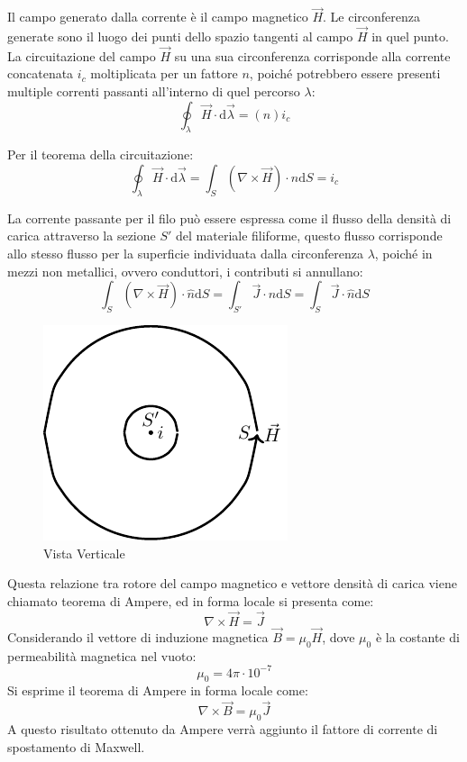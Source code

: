 \documentclass{article}
\newcommand{\df}{\mathrm{d}}
\numberwithin{equation}{subsection}
\begin{document}
Il campo generato dalla corrente è il campo magnetico $\vec{H}$. Le circonferenza generate sono il luogo dei punti dello spazio tangenti al campo $\vec{H}$ 
in quel punto. La circuitazione del campo $\vec{H}$ su una sua circonferenza corrisponde alla corrente concatenata $i_c$ moltiplicata per un fattore $n$, poiché potrebbero essere presenti multiple 
correnti passanti all'interno di quel percorso $\lambda$: 
\begin{equation*}
    \displaystyle\oint_{\lambda}\vec{H}\cdot \df\vec{\lambda}=(n)i_c
\end{equation*}

Per il teorema della circuitazione:
\begin{equation*}
    \displaystyle\oint_{\lambda}\vec{H}\cdot \df\vec{\lambda}=\int_S(\nabla\times\vec{H})\cdot\hat{n}\df S=i_c
\end{equation*}

La corrente passante per il filo può essere espressa come il flusso della densità di carica attraverso la sezione $S'$ del materiale filiforme, questo flusso corrisponde allo 
stesso flusso per la superficie individuata dalla circonferenza $\lambda$, poiché in mezzi non metallici, ovvero conduttori, i contributi si annullano:
\begin{equation}
    \displaystyle\int_S(\nabla\times\vec{H})\cdot\hat{n}\df S=\int_{S'}\vec{J}\cdot\hat{n}\df S=\int_S\vec{J}\cdot\hat{n}\df S
\end{equation}

\begin{figure}[H]%
    \centering
    \includegraphics{corrente-campo-magnetico.pdf}
    \caption{Vista Verticale}
    \label{fig:corrente-campo-magnetico}
\end{figure}

Questa relazione tra rotore del campo magnetico e vettore densità di carica viene chiamato teorema di Ampere, ed in forma locale si presenta come:
\begin{equation*}
    \nabla\times\vec{H}=\vec{J}
\end{equation*}
Considerando il vettore di induzione magnetica $\vec{B}=\mu_0\vec{H}$, dove $\mu_0$ è la costante di permeabilità magnetica nel vuoto:
\begin{equation*}
    \mu_0=4\pi\cdot10^{-7}
\end{equation*}
Si esprime il teorema di Ampere in forma locale come:
\begin{equation}
    \nabla\times\vec{B}=\mu_0\vec{J}
\end{equation}
A questo risultato ottenuto da Ampere verrà aggiunto il fattore di corrente di spostamento di Maxwell. 
\end{document}

